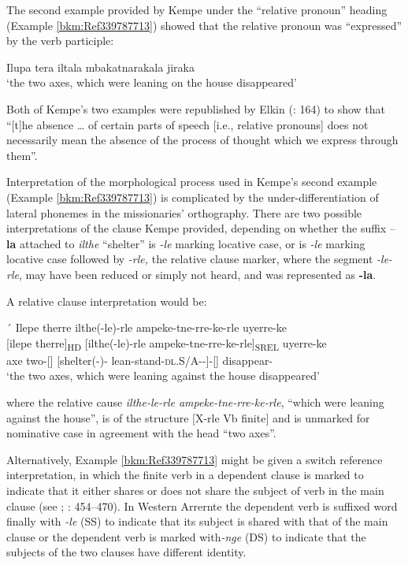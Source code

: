 The second example provided by Kempe under the “relative pronoun” heading (Example \ref{bkm:Ref339787713}) showed that the relative pronoun was “expressed” by the verb participle:

\ea
\label{bkm:Ref339787713}Ilupa   tera   iltala    mbakatnarakala   jiraka\\
\glt `the two axes, which were leaning on the house disappeared'

  \citep[11]{kempe_grammar_1891}
\z

Both of Kempe’s two examples were republished by Elkin (\citeyear{Elkin1937}: 164) to show that “[t]he absence … of certain parts of speech [i.e., relative pronouns] does not necessarily mean the absence of the process of thought which we express through them”.

Interpretation of the morphological process used in Kempe’s second example (Example \ref{bkm:Ref339787713}) is complicated by the under-differentiation of lateral phonemes in the missionaries' orthography. There are two possible interpretations of the clause Kempe provided, depending on whether the suffix –\textbf{la} attached to \textit{ilthe} “shelter” is \textit{-le} marking locative case, or is \textit{-le} marking locative case followed by \textit{-rle,} the relative clause marker, where the segment \textit{-le-rle}, may have been reduced or simply not heard, and was represented as \textbf{-la}.

A relative clause interpretation would be:

\newpage´
\ea
Ilepe   therre       ilthe(-le)-rle               ampeke-tne-rre-ke-rle                         uyerre-ke\\
\gll {}[ilepe  therre]\textsubscript{HD}    [ilthe(-le)-rle              ampeke-tne-rre-ke-rle]\textsubscript{SREL}                uyerre-ke\\
     axe   two-[]                        [shelter(-)-           lean-stand-\textsc{dl}.S/A--]-[]  disappear-\\
\glt `the two axes, which were leaning against the house disappeared'
\z

where the relative cause \textit{ilthe-le-rle ampeke-tne-rre-ke-rle}, “which were leaning against the house'', is of the structure [X-rle Vb finite] and is unmarked for nominative case in agreement with the head “two axes''.

Alternatively, Example \ref{bkm:Ref339787713} might be given a switch reference interpretation, in which the finite verb in a dependent clause is marked to indicate that it either shares or does not share the subject of verb in the main clause (see \citealt{wilkins1988}; \citeyear{wilkins_mparntwe_1989}: 454--470). In Western Arrernte the dependent verb is suffixed word finally with \textit{-le} (SS) to indicate that its subject is shared with that of the main clause or the dependent verb is marked with\textit{-nge} (DS) to indicate that the subjects of the two clauses have different identity.

